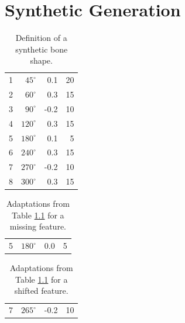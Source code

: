 \documentclass[pdftex,12pt,a4paper]{report}
\begin{document}
\chapter{Synthetic Generation}

\begin{table}[h]
	\begin{center}
		\begin{tabular}{|r|r|r|r|}
			\hline
			\makebox[1cm]{$i$} & \makebox[1cm]{$\mu_i$} & \makebox[1cm]{$h_i$} & \makebox[1cm]{$\sigma_i$} \\
			\hline
			\hline 1 & $45^\circ$ & 0.1 & 20 \\
			\hline 2 & $60^\circ$ & 0.3 & 15 \\
			\hline 3 & $90^\circ$ & -0.2 & 10 \\
			\hline 4 & $120^\circ$ & 0.3 & 15 \\
			\hline 5 & $180^\circ$ & 0.1 & 5 \\
			\hline 6 & $240^\circ$ & 0.3 & 15 \\
			\hline 7 & $270^\circ$ & -0.2 & 10 \\
			\hline 8 & $300^\circ$ & 0.3 & 15 \\
			\hline
		\end{tabular}
	\end{center}
	\caption{Definition of a synthetic bone shape.}
	\label{appendix:table:synthetic-bone}
\end{table}

\begin{table}[h]
	\begin{center}
		\begin{tabular}{|r|r|r|r|}
			\hline
			\makebox[1cm]{$i$} & \makebox[1cm]{$\mu_i$} & \makebox[1cm]{$h_i$} & \makebox[1cm]{$\sigma_i$} \\
			\hline
			\hline 5 & $180^\circ$ & 0.0 & 5 \\
			\hline
		\end{tabular}
	\end{center}
	\caption{Adaptations from Table \ref{appendix:table:synthetic-bone} for a missing feature.}
	\label{appendix:table:synthetic-bone-missing}
\end{table}

\begin{table}[h]
	\begin{center}
		\begin{tabular}{|r|r|r|r|}
			\hline
			\makebox[1cm]{$i$} & \makebox[1cm]{$\mu_i$} & \makebox[1cm]{$h_i$} & \makebox[1cm]{$\sigma_i$} \\
			\hline
			\hline 7 & $265^\circ$ & -0.2 & 10 \\
			\hline
		\end{tabular}
	\end{center}
	\caption{Adaptations from Table \ref{appendix:table:synthetic-bone} for a shifted feature.}
	\label{appendix:table:synthetic-bone-shifted}
\end{table}
\end{document}
